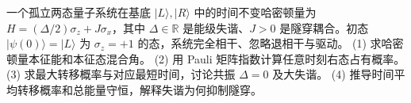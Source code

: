 一个孤立两态量子系统在基底 \(|L\rangle,|R\rangle\) 中的时间不变哈密顿量为 \(H=(\Delta/2)\sigma_z+J\sigma_x\)，其中 \(\Delta\in\mathbb R\) 是能级失谐、\(J>0\) 是隧穿耦合。初态 \(|\psi(0)\rangle=|L\rangle\) 为 \(\sigma_z=+1\) 的态，系统完全相干、忽略退相干与驱动。
(1) 求哈密顿量本征能和本征态混合角。
(2) 用 Pauli 矩阵指数计算任意时刻右态占有概率。
(3) 求最大转移概率与对应最短时间，讨论共振 \(\Delta=0\) 及大失谐。
(4) 推导时间平均转移概率和总能量守恒，解释失谐为何抑制隧穿。
